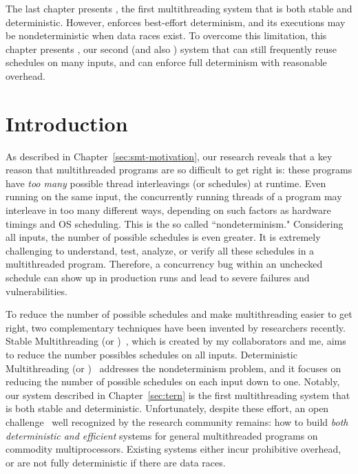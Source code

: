 The last chapter presents \tern, the first multithreading system that is both 
stable and deterministic. However, \tern enforces best-effort determinism, and 
its executions may be nondeterministic when data races exist. To overcome this 
limitation, this chapter presents \peregrine, our second \smt (and also \dmt) 
system that can still frequently reuse schedules on many inputs, and can 
enforce full determinism with reasonable overhead.

\section{Introduction} \label{sec:peregrine-intro}

As described in Chapter~\ref{sec:smt-motivation}, our research reveals that a
key reason that multithreaded programs are so difficult to get right is: these
programs have \emph{too many} possible thread interleavings (or schedules) at
runtime. Even running on the same input, the concurrently running threads of a
program may interleave in too many different ways, depending on such factors as
hardware timings and OS scheduling. This is the so called ``nondeterminism."
Considering all inputs, the number of possible schedules is even greater. It is
extremely challenging to understand, test, analyze, or verify all
these schedules in a multithreaded program. Therefore, a concurrency bug within
an unchecked schedule can show up in production runs and lead to severe
failures and vulnerabilities.

To reduce the number of possible schedules and make multithreading easier to get
right, two complementary techniques have been invented by researchers recently.
Stable Multithreading (or \smt)~\cite{determinator:osdi10, cui:tern:osdi10}, 
which
is created by my collaborators and me, aims to reduce the number possibles
schedules on all inputs. Deterministic Multithreading
(or \dmt)~\cite{dmp:asplos09,kendo:asplos09,coredet:asplos10,
dos:osdi10,grace:oopsla09} addresses the nondeterminism problem, and it focuses
on reducing the number of possible schedules on each input down to one. Notably,
our \tern system described in Chapter~\ref{sec:tern} is the first 
multithreading system that is both stable and deterministic. Unfortunately, 
despite these effort, an open challenge~\cite{wodet11}
well recognized by the research community remains: how to build \emph{both
deterministic and efficient} \dmt systems for general multithreaded programs on
commodity multiprocessors.  Existing \dmt systems either incur prohibitive
overhead, or are not fully deterministic if there are data races.

